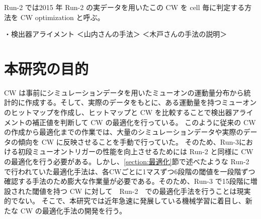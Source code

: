 \subsubsection{}
Run-2 では2015 年 Run-2 の実データを用いたこの CW を cell 毎に判定する方法を CW optimization と呼ぶ。


・検出器アライメント
＜山内さんの手法＞
＜木戸さんの手法の説明＞


\section{本研究の目的}
CW は事前にシミュレーションデータを用いたミューオンの運動量分布から統計的に作成する。そして、実際のデータをもとに、ある運動量を持つミューオンのヒットマップを作成し、ヒットマップと CW を比較することで検出器アライメントの補正値を判断して CW の最適化を行っている。
このように従来の CW の作成から最適化までの作業では、大量のシミュレーションデータや実際のデータの傾向を CW に反映させることを手動で行っていた。
そのため、Run-3における初段ミューオントリガーの性能を向上させるためには Run-2 と同様に CW の最適化を行う必要がある。しかし、\ref{section:最適化}節で述べたような Run-2 で行われていた最適化手法は、各CWごとに1マスずつ6段階の閾値を一段階ずつ確認する手法のため膨大な作業量が必要である。そのため、Run-3 で15段階に増設された閾値を持つ CW に対して　Run-2　での最適化手法を行うことは現実的でない。
そこで、本研究では近年急速に発展している機械学習に着目し、新たな CW の最適化手法の開発を行う。















